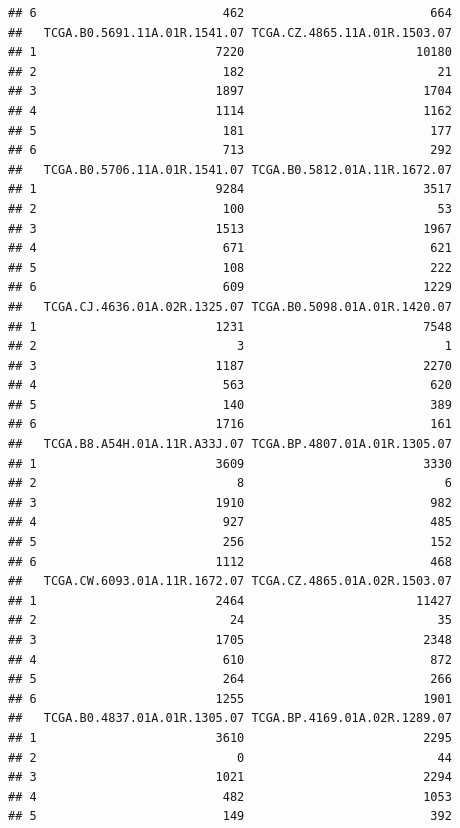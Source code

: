 \documentclass[
]{article}
\begin{document}
\begin{verbatim}
## 6                          462                          664
##   TCGA.B0.5691.11A.01R.1541.07 TCGA.CZ.4865.11A.01R.1503.07
## 1                         7220                        10180
## 2                          182                           21
## 3                         1897                         1704
## 4                         1114                         1162
## 5                          181                          177
## 6                          713                          292
##   TCGA.B0.5706.11A.01R.1541.07 TCGA.B0.5812.01A.11R.1672.07
## 1                         9284                         3517
## 2                          100                           53
## 3                         1513                         1967
## 4                          671                          621
## 5                          108                          222
## 6                          609                         1229
##   TCGA.CJ.4636.01A.02R.1325.07 TCGA.B0.5098.01A.01R.1420.07
## 1                         1231                         7548
## 2                            3                            1
## 3                         1187                         2270
## 4                          563                          620
## 5                          140                          389
## 6                         1716                          161
##   TCGA.B8.A54H.01A.11R.A33J.07 TCGA.BP.4807.01A.01R.1305.07
## 1                         3609                         3330
## 2                            8                            6
## 3                         1910                          982
## 4                          927                          485
## 5                          256                          152
## 6                         1112                          468
##   TCGA.CW.6093.01A.11R.1672.07 TCGA.CZ.4865.01A.02R.1503.07
## 1                         2464                        11427
## 2                           24                           35
## 3                         1705                         2348
## 4                          610                          872
## 5                          264                          266
## 6                         1255                         1901
##   TCGA.B0.4837.01A.01R.1305.07 TCGA.BP.4169.01A.02R.1289.07
## 1                         3610                         2295
## 2                            0                           44
## 3                         1021                         2294
## 4                          482                         1053
## 5                          149                          392

\end{verbatim}
\end{document}

